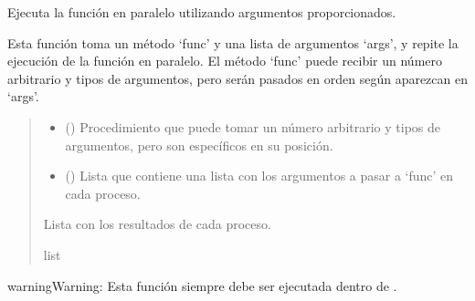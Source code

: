 \documentclass[letterpaper,10pt,english]{sphinxmanual}
\begin{document}

\begin{fulllineitems}
\label{\detokenize{utils:utils.run_in_parallel}}
\pysigstartsignatures
{}
\pysigstopsignatures
\sphinxAtStartPar
Ejecuta la función en paralelo utilizando argumentos proporcionados.

\sphinxAtStartPar
Esta función toma un método ‘func’ y una lista de argumentos ‘args’, y repite la ejecución
de la función en paralelo. El método ‘func’ puede recibir un número arbitrario y tipos de argumentos,
pero serán pasados en orden según aparezcan en ‘args’.
\begin{quote}\begin{description}
\begin{itemize}
\item {} 
\sphinxAtStartPar
{} () \textendash{} Procedimiento que puede tomar un número arbitrario y tipos de argumentos, pero son específicos
en su posición.

\item {} 
\sphinxAtStartPar
{} () \textendash{} Lista que contiene una lista con los argumentos a pasar a ‘func’ en cada proceso.

\end{itemize}

\sphinxAtStartPar
Lista con los resultados de cada proceso.

\sphinxAtStartPar
list

\end{description}\end{quote}

\begin{sphinxadmonition}{warning}{Warning:}
\sphinxAtStartPar
Esta función siempre debe ser ejecutada dentro de .
\end{sphinxadmonition}

\end{fulllineitems}
\end{document}
